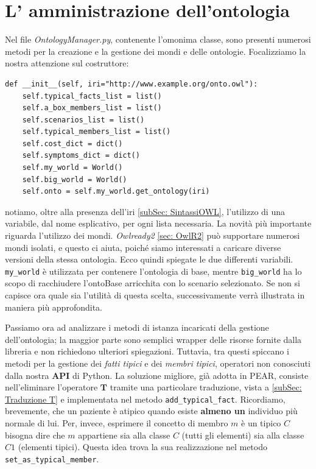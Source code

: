 \section{L' amministrazione dell'ontologia}
Nel file \emph{OntologyManager.py}, contenente l'omonima classe, sono presenti numerosi metodi per
la creazione e la gestione dei mondi e delle ontologie. Focalizziamo la nostra attenzione sul costruttore:
\begin{verbatim}
def __init__(self, iri="http://www.example.org/onto.owl"):
	self.typical_facts_list = list()
	self.a_box_members_list = list()
	self.scenarios_list = list()
	self.typical_members_list = list()
	self.cost_dict = dict()
	self.symptoms_dict = dict()
	self.my_world = World()
	self.big_world = World()
	self.onto = self.my_world.get_ontology(iri)
\end{verbatim}
notiamo, oltre alla presenza dell'iri \ref{subSec: SintassiOWL}, l'utilizzo di una variabile, dal nome esplicativo, 
per ogni lista necessaria. La novità più importante riguarda l'utilizzo dei mondi. \textit{Owlready2 }
\ref{sec: OwlR2} può supportare numerosi mondi isolati, e questo ci aiuta, poiché siamo interessati a caricare
diverse versioni della stessa ontologia. Ecco quindi spiegate le due differenti variabili.
\texttt{my_world} è utilizzata per contenere l'ontologia di base, mentre
\texttt{big_world} ha lo scopo di racchiudere l'ontoBase arricchita con lo scenario selezionato.
Se non si capisce ora quale sia l'utilità di questa scelta, successivamente verrà illustrata in maniera più approfondita.

Passiamo ora ad analizzare i metodi di istanza incaricati della gestione dell'ontologia; la maggior parte sono semplici wrapper delle risorse fornite dalla libreria e non richiedono ulteriori spiegazioni. Tuttavia, 
tra questi spiccano i metodi per la gestione dei \textit{fatti tipici} e dei \textit{membri tipici}, 
operatori non conosciuti dalla nostra \textbf{API} di Python.
La soluzione migliore, già adotta in PEAR, consiste nell'eliminare l'operatore $ \mathbf T $ tramite una
particolare traduzione, vista a \ref{subSec: Traduzione T} e implementata nel metodo 
\texttt{add_typical_fact}.
Ricordiamo, brevemente, che un paziente è atipico quando esiste \textbf{almeno un} individuo più normale di lui.
Per, invece, esprimere il concetto di membro $ m $ è un tipico $ C $ bisogna dire che $ m $ appartiene sia
alla classe $ C $ (tutti gli elementi) sia alla classe $ C1 $ (elementi tipici).
Questa idea trova la sua realizzazione nel metodo \texttt{set_as_typical_member}.

